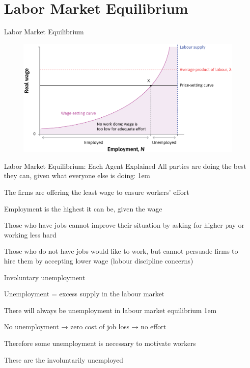 \documentclass[11pt,aspectratio=43,usenames,dvipsnames]{beamer}
\let\olditemize=\itemize
\let\endolditemize=\enditemize
\renewenvironment{itemize}{\olditemize \itemsep1em}{\endolditemize}
\theoremstyle{definition}
\begin{document}
\section[LaborEq]{Labor Market Equilibrium}
\label{sec:Labor_Market_Equilibrium}


\begin{frame}{Labor Market Equilibrium}
\label{slide:Labor_Market_Equilibrium}
    \begin{figure}
        \centering
        \includegraphics[width=\textwidth]{./figures/LaborMarketEq.png}
    \end{figure}
\end{frame}

\begin{frame}{Labor Market Equilibrium: Each Agent Explained}
\label{slide:Labor_Market_Equilibrium__Each_Agent_Explained}
    All parties are doing the best they can, given what everyone else is doing:
    \begin{itemize}
        \item The firms are offering the least wage to ensure workers’ effort
        \item Employment is the highest it can be, given the wage
        \item Those who have jobs cannot improve their situation by asking for higher pay or working less hard
        \item Those who do not have jobs would like to work, but cannot persuade firms to hire them by accepting lower wage (labour discipline concerns)
    \end{itemize}

\end{frame}

\begin{frame}{Involuntary unemployment}
\label{slide:Involuntary_unemployment}
    \begin{center}
        Unemployment = excess supply in the labour market
    \end{center}


There will always be unemployment in labour market equilibrium
\begin{itemize}
    \item No unemployment → zero cost of job loss → no effort
    \item Therefore some unemployment is necessary to motivate workers
    \item These are the involuntarily unemployed
\end{itemize}

\end{frame}
\end{document}
